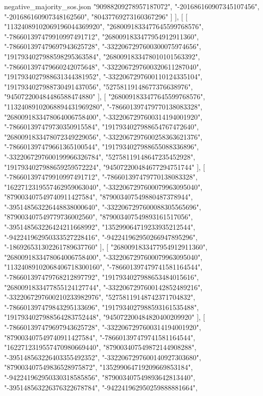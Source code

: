 \begin{filecontents*}[overwrite]{negative_majority_sos.json}
    "90988209278957187072",
    "-201686160907345107456",
    "-201686160907348162560",
    "80437769273160367296"
   ]
  ],
  [
   [
    "11324089102069196044369920",
    "2680091833477645599768576",
    "-786601397479910997491712",
    "2680091833477954912911360",
    "-786601397479697943625728",
    "-3322067297600300075974656",
    "1917934027988598295363584",
    "2680091833478010101563392",
    "-786601397479660242075648",
    "-3322067297600320611287040",
    "1917934027988631344381952",
    "-3322067297600110124335104",
    "1917934027988730491437056",
    "52758119148677376638976",
    "945072200484486588474880"
   ],
   [
    "2680091833477645599768576",
    "11324089102068894431969280",
    "-786601397479770138083328",
    "2680091833478064006758400",
    "-3322067297600314194001920",
    "-786601397479730350915584",
    "1917934027988654767472640",
    "2680091833478072349229056",
    "-3322067297600258363621376",
    "-786601397479661365100544",
    "1917934027988655088336896",
    "-3322067297600199966326784",
    "52758119148647235452928",
    "1917934027988659259572224",
    "945072200484677294751744"
   ],
   [
    "-786601397479910997491712",
    "-786601397479770138083328",
    "1622712319557462959063040",
    "-3322067297600079963095040",
    "879003407549740911427584",
    "879003407549880487378944",
    "-395148563226448838000640",
    "-3322067297600088305565696",
    "879003407549779736002560",
    "879003407549893161517056",
    "-395148563226424211668992",
    "135299064719233935212544",
    "-942241962950333527228416",
    "-942241962950266947895296",
    "-186926531302261789637760"
   ],
   [
    "2680091833477954912911360",
    "2680091833478064006758400",
    "-3322067297600079963095040",
    "11324089102068406718300160",
    "-786601397479741581164544",
    "-786601397479768212897792",
    "1917934027988653484015616",
    "2680091833477855124127744",
    "-3322067297600142852489216",
    "-3322067297600210233982976",
    "52758119148742371704832",
    "-786601397479843295133696",
    "1917934027988593161535488",
    "1917934027988564283752448",
    "945072200484820400209920"
   ],
   [
    "-786601397479697943625728",
    "-3322067297600314194001920",
    "879003407549740911427584",
    "-786601397479741581164544",
    "1622712319557470980669440",
    "879003407549872144908288",
    "-395148563226403355492352",
    "-3322067297600140927303680",
    "879003407549836528975872",
    "135299064719209669853184",
    "-942241962950330318585856",
    "879003407549893642813440",
    "-395148563226376322678784",
    "-942241962950259888881664",

\end{filecontents*}
